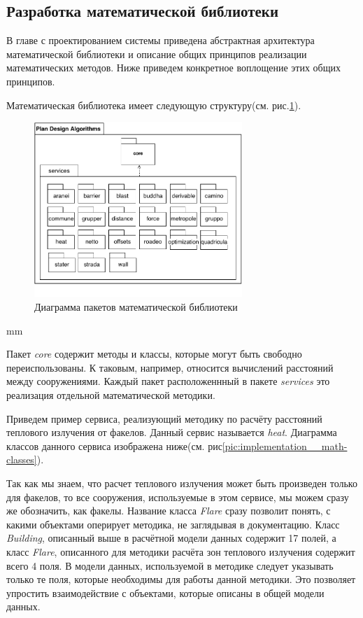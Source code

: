 \subsection{\large{Разработка математической библиотеки}}

В главе с проектированием системы приведена абстрактная архитектура математической библиотеки
и описание общих принципов реализации математических методов. Ниже приведем конкретное воплощение этих общих принципов.

Математическая библиотека имеет следующую структуру(см. рис.\ref{pic:implementation__math-packages}).

\begin{figure}[H]
	\includegraphics[width=0.7\textwidth]{implementation/pictures/math/packages}
	\caption{Диаграмма пакетов математической библиотеки}
	\label{pic:implementation__math-packages}
\end{figure}
 mm

Пакет \textit{core} содержит методы и классы, которые могут быть свободно переиспользованы.
К таковым, например, относится вычислений расстояний между сооружениями.
Каждый пакет расположеннный в пакете \textit{services} это реализация отдельной математической методики.

Приведем пример сервиса, реализующий
методику по расчёту расстояний теплового излучения от факелов. Данный сервис называется \textit{heat}.
Диаграмма классов данного сервиса изображена ниже(см. рис\ref{pic:implementation__math-classes}).

Так как мы знаем, что расчет теплового излучения может быть произведен только для факелов, то все сооружения,
используемые в этом сервисе, мы можем сразу же обозначить, как факелы. Название класса \textit{Flare} сразу позволит
понять, с какими объектами оперирует методика, не заглядывая в документацию.
Класс \textit{Building}, описанный выше в расчётной модели данных содержит 17 полей, а класс \textit{Flare}, описанного для методики расчёта
зон теплового излучения содержит всего 4 поля. В модели данных, используемой в методике следует указывать только те поля,
которые необходимы для работы данной методики. Это позволяет упростить взаимодействие с объектами, которые
описаны в общей модели данных.

